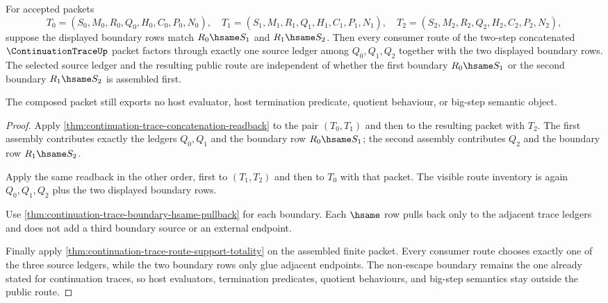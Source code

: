 \begin{theorem}
\label{thm:continuation-trace-route-composition-determinacy}
For accepted packets
$$
T_0=(S_0,M_0,R_0,Q_0,H_0,C_0,P_0,N_0),\quad
T_1=(S_1,M_1,R_1,Q_1,H_1,C_1,P_1,N_1),\quad
T_2=(S_2,M_2,R_2,Q_2,H_2,C_2,P_2,N_2),
$$
suppose the displayed boundary rows match $R_0\hsame S_1$ and $R_1\hsame S_2$. Then every consumer route of the two-step concatenated $\ContinuationTraceUp$ packet factors through exactly one source ledger among $Q_0,Q_1,Q_2$ together with the two displayed boundary rows. The selected source ledger and the resulting public route are independent of whether the first boundary $R_0\hsame S_1$ or the second boundary $R_1\hsame S_2$ is assembled first.

The composed packet still exports no host evaluator, host termination predicate, quotient behaviour, or big-step semantic object.
\end{theorem}
\begin{proof}
Apply \autoref{thm:continuation-trace-concatenation-readback} to the pair $(T_0,T_1)$ and then to the resulting packet with $T_2$. The first assembly contributes exactly the ledgers $Q_0,Q_1$ and the boundary row $R_0\hsame S_1$; the second assembly contributes $Q_2$ and the boundary row $R_1\hsame S_2$.

Apply the same readback in the other order, first to $(T_1,T_2)$ and then to $T_0$ with that packet. The visible route inventory is again $Q_0,Q_1,Q_2$ plus the two displayed boundary rows.

Use \autoref{thm:continuation-trace-boundary-hsame-pullback} for each boundary. Each $\hsame$ row pulls back only to the adjacent trace ledgers and does not add a third boundary source or an external endpoint.

Finally apply \autoref{thm:continuation-trace-route-support-totality} on the assembled finite packet. Every consumer route chooses exactly one of the three source ledgers, while the two boundary rows only glue adjacent endpoints. The non-escape boundary remains the one already stated for continuation traces, so host evaluators, termination predicates, quotient behaviours, and big-step semantics stay outside the public route.
\end{proof}

